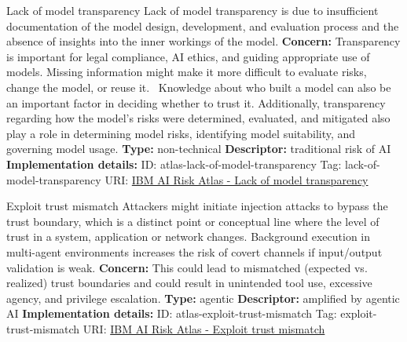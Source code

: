 \documentclass[a4paper,12pt]{article}
\begin{document}
\begin{definitionbox}{Lack of model transparency}
Lack of model transparency is due to insufficient documentation of the model design, development, and evaluation process and the absence of insights into the inner workings of the model.\newline\newline
\textbf{Concern: }Transparency is important for legal compliance, AI ethics, and guiding appropriate use of models. Missing information might make it more difficult to evaluate risks,  change the model, or reuse it.  Knowledge about who built a model can also be an important factor in deciding whether to trust it. Additionally, transparency regarding how the model's risks were determined, evaluated, and mitigated also play a role in determining model risks, identifying model suitability, and governing model usage.\newline\newline
\textbf{Type: }non-technical\newline
\textbf{Descriptor: }traditional risk of AI \newline\newline
\textbf{Implementation details: } \newline
ID: atlas-lack-of-model-transparency \newline
Tag: lack-of-model-transparency \newline
URI:  \href{https://www.ibm.com/docs/en/watsonx/saas?topic=SSYOK8/wsj/ai-risk-atlas/lack-of-model-transparency.html}{IBM AI Risk Atlas - Lack of model transparency}\newline
\end{definitionbox}
\begin{definitionbox}{Exploit trust mismatch}
Attackers might initiate injection attacks to bypass the trust boundary, which is a distinct point or conceptual line where the level of trust in a system, application or network changes. Background execution in multi-agent environments increases the risk of covert channels if input/output validation is weak.\newline\newline
\textbf{Concern: }This could lead to mismatched (expected vs. realized) trust boundaries and could result in unintended tool use, excessive agency, and privilege escalation.\newline\newline
\textbf{Type: }agentic\newline
\textbf{Descriptor: }amplified by agentic AI \newline\newline
\textbf{Implementation details: } \newline
ID: atlas-exploit-trust-mismatch \newline
Tag: exploit-trust-mismatch \newline
URI:  \href{https://www.ibm.com/docs/en/watsonx/saas?topic=SSYOK8/wsj/ai-risk-atlas/exploit-trust-mismatch.html}{IBM AI Risk Atlas - Exploit trust mismatch}\newline
\end{definitionbox}
\end{document}
